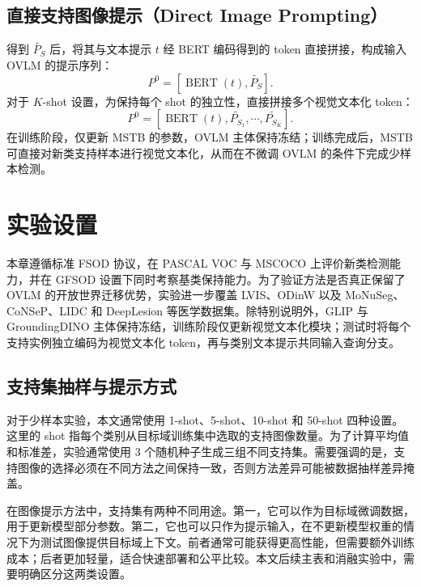 \subsection{直接支持图像提示（Direct Image Prompting）}
得到 $\widetilde{P_S}$ 后，将其与文本提示 $t$ 经 BERT 编码得到的 token 直接拼接，构成输入 OVLM 的提示序列：
\begin{equation}
    P^0 = \left[ \operatorname{BERT}\left(t\right), \widetilde{P_S} \right].
\label{eq:vistex_prompt_1shot}
\end{equation}
对于 $K$-shot 设置，为保持每个 shot 的独立性，直接拼接多个视觉文本化 token：
\begin{equation}
    P^0 = \left[ \operatorname{BERT}\left(t\right), \widetilde{P_{S_1}}, \cdots, \widetilde{P_{S_K}} \right].
\label{eq:vistex_prompt_kshot}
\end{equation}
在训练阶段，仅更新 MSTB 的参数，OVLM 主体保持冻结；训练完成后，MSTB 可直接对新类支持样本进行视觉文本化，从而在不微调 OVLM 的条件下完成少样本检测。

\section{实验设置}
本章遵循标准 FSOD 协议\cite{wang2020frustratingly,zhang2022metaDETR1}，在 PASCAL VOC\cite{everingham2010pascalvoc} 与 MSCOCO\cite{lin2014microsoftCOCO} 上评价新类检测能力，并在 GFSOD 设置下同时考察基类保持能力。为了验证方法是否真正保留了 OVLM 的开放世界迁移优势，实验进一步覆盖 LVIS\cite{gupta2019lvis}、ODinW\cite{li2022odinw} 以及 MoNuSeg\cite{kumar2017dataset}、CoNSeP\cite{graham2019hover}、LIDC 和 DeepLesion 等医学数据集。除特别说明外，GLIP 与 GroundingDINO 主体保持冻结，训练阶段仅更新视觉文本化模块；测试时将每个支持实例独立编码为视觉文本化 token，再与类别文本提示共同输入查询分支。

\subsection{支持集抽样与提示方式}
对于少样本实验，本文通常使用 1-shot、5-shot、10-shot 和 50-shot 四种设置。这里的 shot 指每个类别从目标域训练集中选取的支持图像数量。为了计算平均值和标准差，实验通常使用 3 个随机种子生成三组不同支持集。需要强调的是，支持图像的选择必须在不同方法之间保持一致，否则方法差异可能被数据抽样差异掩盖。

在图像提示方法中，支持集有两种不同用途。第一，它可以作为目标域微调数据，用于更新模型部分参数。第二，它也可以只作为提示输入，在不更新模型权重的情况下为测试图像提供目标域上下文。前者通常可能获得更高性能，但需要额外训练成本；后者更加轻量，适合快速部署和公平比较。本文后续主表和消融实验中，需要明确区分这两类设置。

